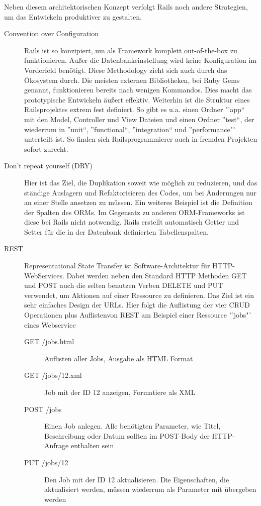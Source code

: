 Neben diesem architektorischen Konzept verfolgt Rails noch andere Strategien, um das Entwickeln produktiver zu gestalten.
\begin{description}
 \item[Convention over Configuration] Rails ist so konzipiert, um als Framework komplett out-of-the-box zu funktionieren. Außer die Datenbankeinstellung wird keine Konfiguration im Vorderfeld benötigt. Diese Methodology zieht sich auch durch das Ökosystem durch. Die meisten externen Bibliotheken, bei Ruby Gems genannt, funktionieren bereits nach wenigen Kommandos. Dies macht das prototypische Entwickeln äußert effektiv. Weiterhin ist die Struktur eines Railsprojektes extrem fest definiert. So gibt es u.a. einen Ordner "'app"` mit den Model, Controller und View Dateien und einen Ordner "'test"`, der wiederrum in "'unit"`, "'functional"`, "'integration"` und "'performance"` unterteilt ist. So finden sich Railsprogrammierer auch in fremden Projekten sofort zurecht.
 \item[Don't repeat yourself (DRY)] Hier ist das Ziel, die Duplikation soweit wie möglich zu reduzieren, und das ständige Auslagern und Refaktorisieren des Codes, um bei Änderungen nur an einer Stelle ansetzen zu müssen. Ein weiteres Beispiel ist die Definition der Spalten des ORMs. Im Gegensatz zu anderen ORM-Frameworks ist diese bei Rails nicht notwendig. Rails erstellt automatisch Getter und Setter für die in der Datenbank definierten Tabellenspalten.
 \item[REST] Representational State Transfer ist Software-Architektur für HTTP-WebServices. Dabei werden neben den Standard HTTP Methoden GET und POST auch die selten benutzen Verben DELETE und PUT verwendet, um Aktionen auf einer Ressource zu definieren. Das Ziel ist ein sehr einfaches Design der URLs. Hier folgt die Auflistung der vier CRUD Operationen plus Auflistenvon REST am Beispiel einer Ressource "'jobs"` eines Webservice
 \begin{description}
  \item[GET /jobs.html] Auflisten aller Jobs, Ausgabe als HTML Format
  \item[GET /jobs/12.xml] Job mit der ID 12 anzeigen, Formatiere als XML
  \item[POST /jobs] Einen Job anlegen. Alle benötigten Parameter, wie Titel, Beschreibung oder Datum sollten im POST-Body der HTTP-Anfrage enthalten sein
  \item[PUT /jobs/12] Den Job mit der ID 12 aktualisieren. Die Eigenschaften, die aktualisiert werden, müssen wiederrum als Parameter mit übergeben werden

\end{description}
\end{description}
